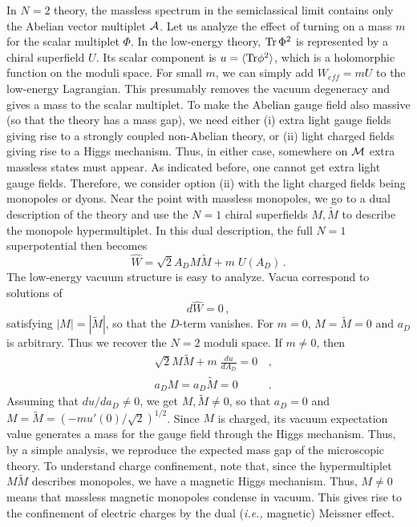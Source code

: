 In $N=2$ theory, the massless spectrum in the semiclassical limit
contains only the Abelian vector multiplet ${\cal A}$.  Let us analyze
the effect of turning on a mass $m$ for the scalar multiplet
$\Phi$. In the low-energy theory, ${\rm Tr}\,\Phi^2$ is represented by
a chiral superfield $U$. Its scalar component is $u =\langle{\rm
Tr}\phi^2\rangle$, which is a holomorphic function on the moduli
space. For small $m$, we can simply add $W_{eff} = mU$ to the 
low-energy Lagrangian. This presumably removes the vacuum degeneracy
and gives a mass to the scalar multiplet. To make the Abelian gauge
field also massive (so that the theory has a mass gap), we need either
(i) extra light gauge fields giving rise to a strongly coupled
non-Abelian theory, or (ii) light charged fields giving rise to a
Higgs mechanism.  Thus, in either case, somewhere on ${\cal M}$ extra
massless states must appear. As indicated before, one cannot get extra
light gauge fields. Therefore, we consider option (ii) with the light
charged fields being monopoles or dyons. Near the point with massless
monopoles, we go to a dual description of the theory and use the $N=1$
chiral superfields $M, \widetilde M$ to describe the monopole
hypermultiplet. In this dual description, the full $N=1$
superpotential then becomes
$$
\hat{W} = \sqrt{2} A_{D} M \widetilde M + m \; U(A_{D})\,.
$$
The low-energy vacuum structure is easy to analyze. Vacua correspond
to solutions of
$$
d \hat{W} = 0\,,
$$
satisfying $|M| = |\widetilde M|$, so that the $D$-term vanishes. For $m
=0$, $M=\widetilde M =0$ and $a_{D}$ is arbitrary. Thus we recover the
$N=2$ moduli space. If $m \not= 0$, then 
\begin{eqnarray}
&{\displaystyle
\sqrt{2} M \widetilde M + m \; \frac{du}{dA_{D}} = 0} &\,,\nonumber \\
& a_{D}M = a_{D}\widetilde M = 0 &\,.\nonumber 
\end{eqnarray}
Assuming that $du/da_{D} \not= 0$, we get $M, \widetilde M\not= 0$, so
that $a_D=0$ and $M=\widetilde M=(-m u'(0)/\sqrt{2})^{1/2}$. Since $M$
is charged, its vacuum expectation value generates a mass for the
gauge field through the Higgs mechanism. Thus, by a simple analysis,
we reproduce the expected mass gap of the microscopic theory. To
understand charge confinement, note that, since the hypermultiplet
$M\widetilde M$ describes monopoles, we have a magnetic Higgs
mechanism. Thus, $M\ne 0$ means that massless magnetic monopoles
condense in vacuum. This gives rise to the confinement of electric
charges by the dual ({\it i.e.,} magnetic) Meissner effect.  


